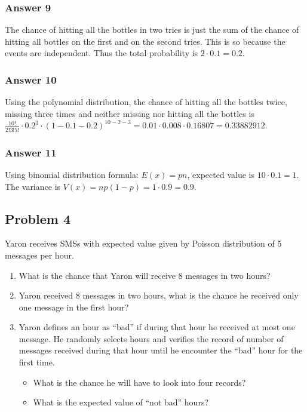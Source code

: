 \documentclass[11pt]{article}
\begin{document}
\subsubsection{Answer 9}
\label{sec:orgheadline11}
The chance of hitting all the bottles in two tries is just the sum of
the chance of hitting all bottles on the first and on the second tries.
This is so because the events are independent.  Thus the total probability
is \(2 \cdot 0.1 = 0.2\).

\subsubsection{Answer 10}
\label{sec:orgheadline12}
Using the polynomial distribution, the chance of hitting all the bottles
twice, missing three times and neither missing nor hitting all the bottles
is \(\frac{10!}{2!3!5!} \cdot 0.2^3 \cdot (1 - 0.1 - 0.2)^{10 - 2 - 3} = 0.01
    \cdot 0.008 \cdot 0.16807 = \num{0.33882912}\).

\subsubsection{Answer 11}
\label{sec:orgheadline13}
Using binomial distribution formula: \(E(x)=pn\), expected value is \(10 \cdot
    0.1 = 1\).  The variance is \(V(x)= np(1 - p) = 1 \cdot 0.9 = 0.9\).

\subsection{Problem 4}
\label{sec:orgheadline19}
Yaron receives SMSs with expected value given by Poisson distribution of
5 messages per hour.
\begin{enumerate}
\item What is the chance that Yaron will receive 8 messages in two hours?
\item Yaron received 8 messages in two hours, what is the chance he received
only one message in the first hour?
\item Yaron defines an hour as ``bad'' if during that hour he received at most
one message.  He randomly selects hours and verifies the record of number
of messages received during that hour until he encounter the ``bad'' hour
for the first time.
\begin{itemize}
\item What is the chance he will have to look into four records?
\item What is the expected value of ``not bad'' hours?
\end{itemize}
\end{enumerate}
\end{document}
